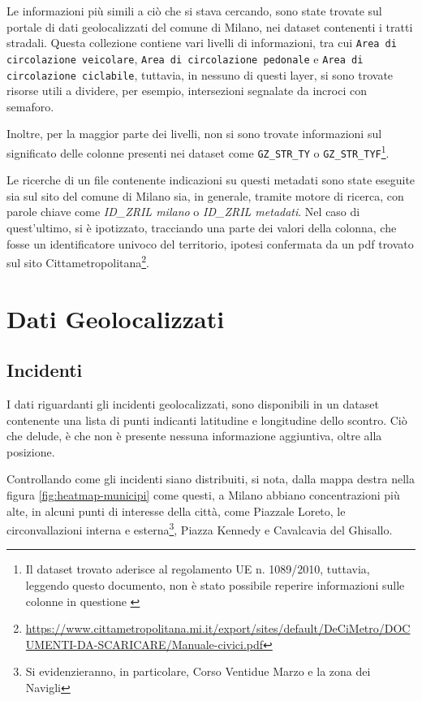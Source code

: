 \documentclass[a4paper,12pt]{report}
\newcommand{\columnstyle}[1]{\texttt{#1}}
\newcommand{\quotestyle}[1]{\textit{#1}}
\begin{document}
Le informazioni più simili a ciò che si stava cercando, 
sono state trovate sul portale di dati geolocalizzati 
del comune di Milano, nei dataset contenenti i tratti stradali. 
Questa collezione contiene vari livelli di informazioni, tra cui 
\columnstyle{Area di circolazione veicolare}, 
\columnstyle{Area di circolazione pedonale} e \columnstyle{Area di circolazione ciclabile}, 
tuttavia, in nessuno di questi layer, si sono trovate risorse utili a dividere, 
per esempio, intersezioni segnalate da incroci con semaforo. 

Inoltre, per la maggior parte dei livelli, non si sono trovate informazioni sul significato 
delle colonne presenti nei dataset come \columnstyle{GZ\_STR\_TY} o 
\columnstyle{GZ\_STR\_TYF}\footnote{Il dataset trovato aderisce al regolamento UE n. 1089/2010, 
tuttavia, leggendo questo documento, non è stato possibile reperire informazioni sulle colonne 
in questione \cite{REGOLAMENTOUE:1}}. 

Le ricerche di un file contenente indicazioni su questi metadati sono state eseguite sia 
sul sito del comune di Milano sia, in generale, tramite motore di ricerca, con parole chiave 
come \quotestyle{ID\_ZRIL milano} o \quotestyle{ID\_ZRIL metadati}. 
Nel caso di quest'ultimo, si è ipotizzato, tracciando una parte dei valori della colonna, 
che fosse un identificatore univoco del territorio, ipotesi confermata 
da un pdf trovato sul sito 
Cittametropolitana\footnote{\url{https://www.cittametropolitana.mi.it/export/sites/default/DeCiMetro/DOCUMENTI-DA-SCARICARE/Manuale-civici.pdf}}. 

\chapter{Dati Geolocalizzati}

\section{Incidenti}

I dati riguardanti gli incidenti geolocalizzati, sono disponibili in un dataset 
contenente una lista di punti indicanti latitudine e longitudine dello scontro. 
Ciò che delude, è che non è presente nessuna informazione aggiuntiva, 
oltre alla posizione. 

Controllando come gli incidenti siano distribuiti, 
si nota, dalla mappa destra nella figura \ref{fig:heatmap-municipi} come questi, 
a Milano abbiano concentrazioni più alte, 
in alcuni punti di interesse della città, come Piazzale Loreto, le circonvallazioni 
interna e esterna\footnote{Si evidenzieranno, in particolare, Corso Ventidue Marzo 
e la zona dei Navigli}, Piazza Kennedy e Cavalcavia del Ghisallo. 
\end{document}
